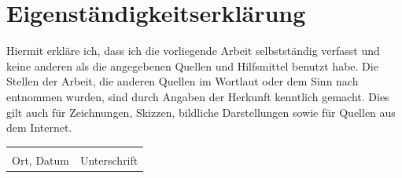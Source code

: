 \documentclass[12pt,a4paper,oneside]{report}
\begin{document}
\clearpage


\clearpage
\chapter*{Eigenst\"{a}ndigkeitserkl\"{a}rung}

Hiermit erkl\"{a}re ich, dass ich die vorliegende Arbeit selbstst\"{a}ndig verfasst und keine anderen als die angegebenen Quellen und Hilfsmittel benutzt habe.
Die Stellen der Arbeit, die anderen Quellen im Wortlaut oder dem Sinn nach entnommen wurden, sind durch Angaben der Herkunft kenntlich gemacht.
Dies gilt auch f\"{u}r Zeichnungen, Skizzen, bildliche Darstellungen sowie f\"{u}r Quellen aus dem Internet.

\vspace{2cm}
\noindent
\begin{tabular}{@{}p{6cm}p{6cm}@{}}
  \hrulefill & \hrulefill \\
  Ort, Datum & Unterschrift
\end{tabular}
\end{document}
